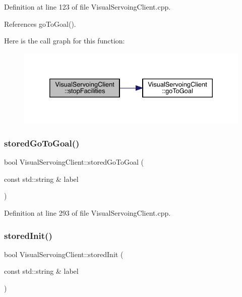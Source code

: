Definition at line 123 of file Visual\+Servoing\+Client.\+cpp.



References go\+To\+Goal().

Here is the call graph for this function\+:
\nopagebreak
\begin{figure}[H]
\begin{center}
\leavevmode
\includegraphics[width=332pt]{classVisualServoingClient_a6086c261684ff994d4daf31a1a7ffd0f_cgraph}
\end{center}
\end{figure}
\mbox{\label{classVisualServoingClient_af1070526a82d7e99bb0dba8a34bc68cf}} 
\subsubsection{\texorpdfstring{stored\+Go\+To\+Goal()}{storedGoToGoal()}}
{\footnotesize\ttfamily bool Visual\+Servoing\+Client\+::stored\+Go\+To\+Goal (\begin{DoxyParamCaption}\item[{const std\+::string \&}]{label }\end{DoxyParamCaption})\hspace{0.3cm}{\ttfamily [override]}}



Definition at line 293 of file Visual\+Servoing\+Client.\+cpp.

\mbox{\label{classVisualServoingClient_a0b7df161daebc8c947c8a29ad7e309ef}} 
\subsubsection{\texorpdfstring{stored\+Init()}{storedInit()}}
{\footnotesize\ttfamily bool Visual\+Servoing\+Client\+::stored\+Init (\begin{DoxyParamCaption}\item[{const std\+::string \&}]{label }\end{DoxyParamCaption})\hspace{0.3cm}{\ttfamily [override]}}



